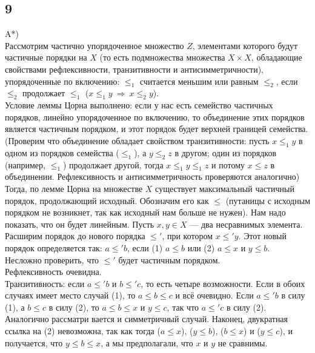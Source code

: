 		\subsection{9}
		A*)\\
		Рассмотрим частично упорядоченное множество $Z$, элементами которого будут частичные порядки на $X$ (то есть подмножества множества $X \times X$, обладающие свойствами рефлексивности, транзитивности и антисимметричности), упорядоченные по включению: $\leqslant_1$ считается меньшим или равным $\leqslant_2$, если $\leqslant_2$ продолжает $\leqslant_1$ ($x \leqslant_1 y \ \Rightarrow \ x \leqslant_2 y$).\\
		Условие леммы Цорна выполнено: если у нас есть семейство частичных порядков, линейно упорядоченное по включению, то объединение этих порядков является частичным порядком, и этот порядок будет верхней границей семейства.\\
		(Проверим что объединение обладает свойством транзитивности: пусть $x \leqslant_1 y$ в одном из порядков семейства ($\leqslant_1$), а $y \leqslant_2 z$ в другом; один из порядков (например, $\leqslant_1$) продолжает другой, тогда $x \leqslant_1 y \leqslant_1 z$ и потому $x \leqslant z$ в объединении. Рефлексивность и антисимметричность проверяются аналогично)\\
		Тогда, по лемме Цорна на множестве $X$ существует максимальный частичный порядок, продолжающий исходный. Обозначим его как $\leqslant$ (путаницы с исходным порядком не возникнет, так как исходный нам больше не нужен). Нам надо показать, что он будет линейным. Пусть $x, y \in X$ — два несравнимых элемента. Расширим порядок до нового порядка $\leqslant'$, при котором $x \leqslant' y$. Этот новый порядок определяется так: $a \leqslant' b$, если (1) $a \leqslant b$ или (2) $a \leqslant x$ и $y \leqslant b$.\\
		Несложно проверить, что $\leqslant'$ будет частичным порядком.\\
		Рефлексивность очевидна.\\
		Транзитивность: если $a \leqslant' b$ и $b \leqslant' c$, то есть четыре возможности. Если в обоих случаях имеет место случай (1), то $a \leqslant b \leqslant c$ и всё очевидно. Если $a \leqslant' b$ в силу (1), а $b \leqslant c$ в силу (2), то $a \leqslant b \leqslant x$ и $y \leqslant c$, так что $a \leqslant' c$ в силу (2). Аналогично рассматри вается и симметричный случай. Наконец, двукратная ссылка на (2) невозможна, так как тогда ($a \leqslant x$), ($y \leqslant b$), ($b \leqslant x$) и ($y \leqslant c$), и получается, что $y \leqslant b \leqslant x$, а мы предполагали, что $x$ и $y$ не сравнимы.
